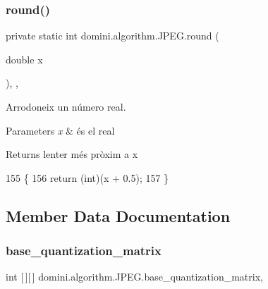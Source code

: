 \subsubsection{\texorpdfstring{round()}{round()}}
{\footnotesize\ttfamily private static int domini.\+algorithm.\+J\+P\+E\+G.\+round (\begin{DoxyParamCaption}\item[{double}]{x }\end{DoxyParamCaption})\hspace{0.3cm}{\ttfamily [inline]}, {\ttfamily [static]}, {\ttfamily [private]}}



Arrodoneix un número real. 


\begin{DoxyParams}{Parameters}
{\em x} & és el real \\
\hline
\end{DoxyParams}
\begin{DoxyReturn}{Returns}
l\textquotesingle{}enter més pròxim a x 
\end{DoxyReturn}

\begin{DoxyCode}
155                                        \{
156         \textcolor{keywordflow}{return} (\textcolor{keywordtype}{int})(x + 0.5);
157     \}
\end{DoxyCode}


\subsection{Member Data Documentation}
\mbox{\label{classdomini_1_1algorithm_1_1JPEG_a1f91c0bad6cfd3ac22bec68bc28564c5}} 
\subsubsection{\texorpdfstring{base\+\_\+quantization\+\_\+matrix}{base\_quantization\_matrix}}
{\footnotesize\ttfamily int \mbox{[}$\,$\mbox{]}\mbox{[}$\,$\mbox{]} domini.\+algorithm.\+J\+P\+E\+G.\+base\+\_\+quantization\+\_\+matrix\hspace{0.3cm}{\ttfamily [static]}, {\ttfamily [private]}}

